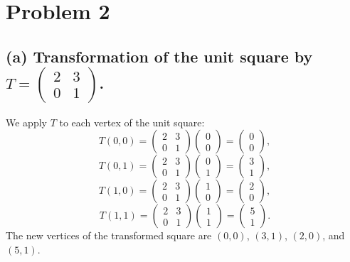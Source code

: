 \documentclass[11pt]{article}
\begin{document}
\section{Problem 2}

\subsection{(a) Transformation of the unit square by $T = \begin{pmatrix} 2 & 3 \\ 0 & 1 \end{pmatrix}$.}

We apply $T$ to each vertex of the unit square:
\[
T(0,0) = \begin{pmatrix} 2 & 3 \\ 0 & 1 \end{pmatrix} \begin{pmatrix} 0 \\ 0 \end{pmatrix} = \begin{pmatrix} 0 \\ 0 \end{pmatrix},
\]
\[
T(0,1) = \begin{pmatrix} 2 & 3 \\ 0 & 1 \end{pmatrix} \begin{pmatrix} 0 \\ 1 \end{pmatrix} = \begin{pmatrix} 3 \\ 1 \end{pmatrix},
\]
\[
T(1,0) = \begin{pmatrix} 2 & 3 \\ 0 & 1 \end{pmatrix} \begin{pmatrix} 1 \\ 0 \end{pmatrix} = \begin{pmatrix} 2 \\ 0 \end{pmatrix},
\]
\[
T(1,1) = \begin{pmatrix} 2 & 3 \\ 0 & 1 \end{pmatrix} \begin{pmatrix} 1 \\ 1 \end{pmatrix} = \begin{pmatrix} 5 \\ 1 \end{pmatrix}.
\]
The new vertices of the transformed square are $(0, 0)$, $(3, 1)$, $(2, 0)$, and $(5, 1)$.
\end{document}
